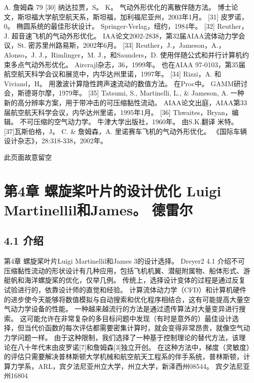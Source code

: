 \documentclass[UTF8,11pt,a4paper,openany,fontset=fandol]{ctexbook}
\begin{document}
A. 詹姆森 79 [30] 纳达拉贾，S。 K。 气动外形优化的离散伴随方法。 博士论文，斯坦福大学航空航天系，斯坦福，加利福尼亚州，2003年1月。 [31] 皮罗诺，0。 椭圆系统的最佳形状设计。 Springer-Verlag，纽约，1984年。 [32] Reuther，J. 超音速飞机的气动外形优化。 IAA论文2002-2838，第32届AIAA流体动力学会议，St. 密苏里州路易斯，2002年6月。 [33] Reuther，J.，Jameson，A.，Alonso，J. J.，Rimlinger，M. J.，和Saunders，D. 使用伴随公式和并行计算机约束多点气动外形优化。 Aircrajl杂志，36，1999年。 也在AIAA 97-0103，第35届航空航天科学会议和展览中，内华达州里诺，1997年。 [34] Rizzi，A. 和Viviand，H。 用激波计算隐性跨声速流动的数值方法。 在Proc中。 GAMM研讨会，斯德哥尔摩，1979年。 [35] Tatsumi, S., Martinelli, L., \& Jameson, A. 一种新的高分辨率方案，用于带冲击的可压缩黏性流动。 AIAA论文出庭，AIAA第33届航空航天科学会议，内华达州里诺，1995年1月。 [36] Thwaites，Bryan，编辑。 不可压缩的空气动力学。 牛津大学出版社，1960年。 由S.K.翻译 米特。 [37]瓦斯伯格，J。 C. \& 詹姆森，A. 里诺赛车飞机的气动外形优化。 《国际车辆设计杂志》，28:318-338，2002年。

此页面故意留空

\clearpage
\chapter{第4章 螺旋桨叶片的设计优化 Luigi Martinellil和James。 德雷尔}
\section{4.1 介绍}
第4章 螺旋桨叶片Luigi Martinellil和James 3的设计选择。 Dreyer2 4.1 介绍不可压缩黏性流动的形状设计有几种应用，包括飞机机翼、潜艇附属物、船体形式、游艇帆和海洋螺旋桨的优化，仅举几例。 传统上，选择设计变体的过程是通过反复试验进行的，依靠设计师的直觉和经验。 计算流体动力学（CFD）和计算机硬件的进步使今天能够将数值模拟与自动搜索和优化程序相结合，这有可能提高大量空气动力学设备的性能。 一种越来越流行的方法是通过遗传算法对大量变异进行搜索。 这可能允许在非常复杂的多目标问题中发现（有时是意外的）最佳设计选择，但当代价函数的每次评估都需要密集计算时，就会变得非常昂贵，就像空气动力学问题一样。 由于这种限制，我们选择了一种基于控制理论的替代方法，该理论在八十年代末由皮罗诺[7]和詹姆森[3]独立开创。 在这种方法中，梯度（灵敏度）的评估只需要解决普林斯顿大学机械和航空航天工程系的伴手系统，普林斯顿，计算力学系，ARL，宾夕法尼亚州立大学，州立大学，新泽西州08544。 宾夕法尼亚州16804
\end{document}
